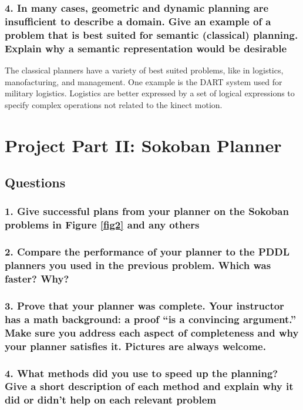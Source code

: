 \documentclass[10pt, letter]{article}
\begin{document}
\subsubsection*{4. In many cases, geometric and dynamic planning are insufficient to describe a domain. Give
an example of a problem that is best suited for semantic (classical) planning. Explain why a
semantic representation would be desirable}

The classical planners have a variety of best suited problems, like in logistics, manofacturing, and management. One example is the DART system used for military logistics. Logistics are better expressed by a set of logical expressions to specify complex operations not related to the kinect motion.


\section{Project Part II: Sokoban Planner}
\subsection{Questions}
\subsubsection*{1. Give successful plans from your planner on the Sokoban problems in Figure \ref{fig2} and any others}
\subsubsection*{2. Compare the performance of your planner to the PDDL planners you used in the previous
problem. Which was faster? Why?}
\subsubsection*{3. Prove that your planner was complete. Your instructor has a math background: a proof ``is
a convincing argument.'' Make sure you address each aspect of completeness and why your
planner satisfies it. Pictures are always welcome.}
\subsubsection*{4. What methods did you use to speed up the planning? Give a short description of each method
and explain why it did or didn't help on each relevant problem}
\end{document}
